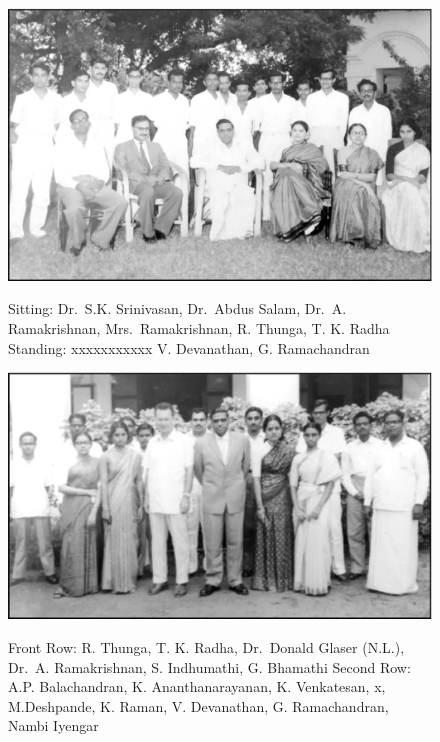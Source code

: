 \begin{figure}[H]
\centering
\includegraphics[scale=.33]{src/images/chap3/chap3-fig1.eps}\\
\caption{Sitting: Dr.\ S.K. Srinivasan, Dr.\ Abdus Salam, Dr.\ A. Ramakrishnan, Mrs.\ Ramakrishnan, R. Thunga, T. K. Radha
Standing: xxxxxxxxxxx V. Devanathan, G. Ramachandran}
\end{figure}

\begin{figure}[H]
\centering
\includegraphics[scale=.33]{src/images/chap3/chap3-fig2.eps}\\
\caption{Front Row: R. Thunga, T. K. Radha, Dr.\ Donald Glaser (N.L.), Dr.\ A. Ramakrishnan, S. Indhumathi, G. Bhamathi
Second Row: A.P. Balachandran, K. Ananthanarayanan, K. Venkatesan, x, M.Deshpande, K. Raman, V. Devanathan, G. Ramachandran, Nambi Iyengar}
\end{figure}

